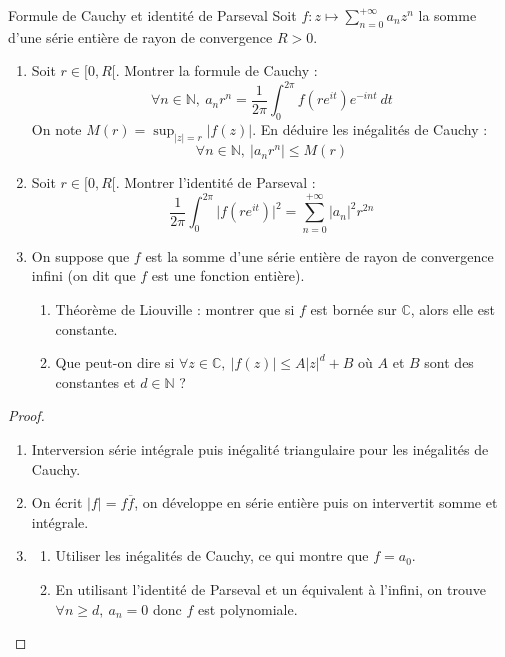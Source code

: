 \documentclass[french,a4paper]{article}
\newcommand{\N}{\mathbb{N}}
\newcommand{\C}{\mathbb{C}}
\theoremstyle{plain}
\theoremstyle{definition}
\theoremstyle{remark}
\begin{document}
\begin{ex}[Châteaux]{Formule de Cauchy et identité de Parseval}
	Soit $f:z\mapsto\displaystyle\sum_{n=0}^{+\infty}a_nz^n$ la somme d'une série entière de rayon de convergence $R>0$.
	\begin{enumerate}
		\item Soit $r\in[0,R[$. Montrer la formule de Cauchy : $$\forall n\in\N,\ a_nr^n=\frac{1}{2\pi}\int_{0}^{2\pi}f(re^{it})e^{-int}\ dt$$ On note $M(r)=\displaystyle\sup_{\lvert z\rvert=r}\lvert f(z)\rvert$. En déduire les inégalités de Cauchy : $$\forall n\in\N,\ \lvert a_nr^n\rvert\leqslant M(r)$$
		\item Soit $r\in[0,R[$. Montrer l'identité de Parseval : $$\frac{1}{2\pi}\int_{0}^{2\pi}\lvert f(re^{it})\rvert^2=\sum_{n=0}^{+\infty}\vert a_n\rvert^2r^{2n}$$
		\item On suppose que $f$ est la somme d'une série entière de rayon de convergence infini (on dit que $f$ est une fonction entière). 
		\begin{enumerate}[label=\alph*.]
			\item Théorème de Liouville : montrer que si $f$ est bornée sur $\C$, alors elle est constante.
			\item Que peut-on dire si $\forall z\in\C,\ \lvert f(z)\rvert\leqslant A\lvert z\rvert^d+B$ où $A$ et $B$ sont des constantes et $d\in\N$ ?
		\end{enumerate}
	\end{enumerate}
\end{ex}
\begin{proof}
	\begin{enumerate}
		\item Interversion série intégrale puis inégalité triangulaire pour les inégalités de Cauchy.
		\item On écrit $\lvert f\rvert=f\overline{f}$, on développe en série entière puis on intervertit somme et intégrale.
		\item \begin{enumerate}[label=\alph*.]
			\item Utiliser les inégalités de Cauchy, ce qui montre que $f=a_0$.
			\item En utilisant l'identité de Parseval et un équivalent à l'infini, on trouve $\forall n\geqslant d,\ a_n=0$ donc $f$ est polynomiale.
		\end{enumerate}
	\end{enumerate}
\end{proof}
\end{document}
